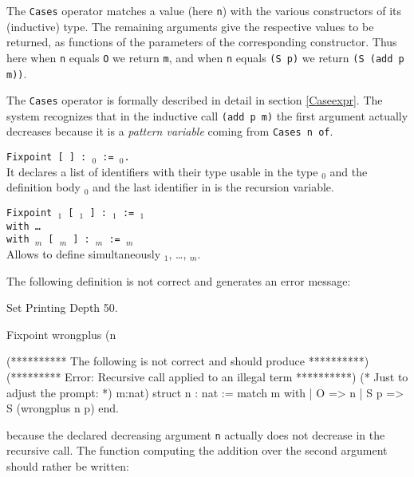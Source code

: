 The {\tt Cases} operator matches a value (here \verb:n:) with the
various constructors of its (inductive) type. The remaining arguments
give the respective values to be returned, as functions of the
parameters of the corresponding constructor. Thus here when \verb:n:
equals \verb:O: we return \verb:m:, and when \verb:n: equals 
\verb:(S p): we return \verb:(S (add p m)):.

The {\tt Cases} operator is formally described
in detail in section \ref{Caseexpr}.  The system recognizes that in
the inductive call {\tt (add p m)} the first argument actually
decreases because it is a {\em pattern variable} coming from {\tt Cases
  n of}.

\begin{Variants}
\item {\tt Fixpoint {\ident} [ {\params} ] : \type$_0$ :=
\term$_0$.}\\
        It declares a list of identifiers with their type
        usable in the type \type$_0$ and the definition body \term$_0$
        and the last identifier in {\params} is the recursion variable.
\item {\tt Fixpoint {\ident$_1$} [ {\params$_1$} ] :
        {\type$_1$} := {\term$_1$}\\
        with {\ldots} \\
        with {\ident$_m$}  [ {\params$_m$} ] : {\type$_m$} := 
        {\type$_m$}}\\
        Allows to define simultaneously {\ident$_1$}, {\ldots},
        {\ident$_m$}.
\end{Variants}

\Example The following definition is not correct and generates an
error message:

\begin{coq_eval}
Set Printing Depth 50.
\end{coq_eval}
\begin{coq_example}
Fixpoint wrongplus
 (n
  
  (********** The following is not correct and should produce **********)
  (********* Error: Recursive call applied to an illegal term **********)
  (* Just to adjust the prompt: *) m:nat) {struct n} : nat :=
  match m with
  | O => n
  | S p => S (wrongplus n p)
  end.
\end{coq_example}

because the declared decreasing argument {\tt n} actually does not
decrease in the recursive call.  The function computing the addition
over the second argument should rather be written:

